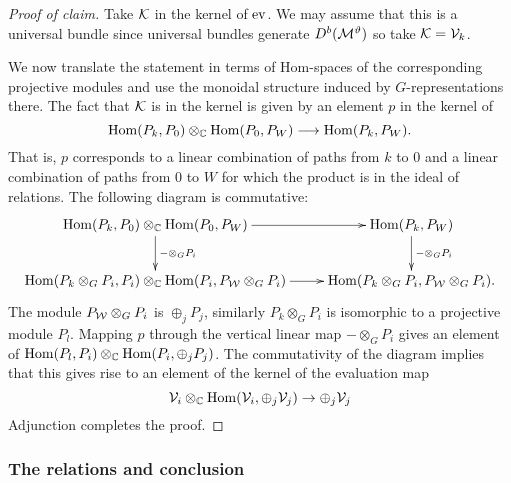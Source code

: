 \documentclass{amsart}
\theoremstyle{definition}
\begin{document}
\begin{proof}[Proof of claim]
Take $\mathcal{K}$ in the kernel of $\operatorname{ev}$.
We may assume that this is a universal bundle since universal bundles generate $D^b(\mathcal{M}^\vartheta)$ so take $\mathcal{K}=\mathcal{V}_k$.

We now translate the statement in terms of Hom-spaces of the corresponding projective modules and use the monoidal structure induced by $G$-representations there.
The fact that $\mathcal{K}$ is in the kernel is given by an element $p$ in the kernel of 
\begin{equation}
    \operatorname{Hom}(P_k, P_0) \otimes_{\mathbb{C}} \operatorname{Hom}(P_0, P_W) \longrightarrow \operatorname{Hom}(P_k, P_W).
\end{equation}
That is, $p$ corresponds to a linear combination of paths from $k$ to $0$ and a linear combination of paths from $0$ to $W$ for which the product is in the ideal of relations.
The following diagram is commutative:
\begin{equation*}
    \xymatrix{\Hom(P_k, P_0) \otimes_\bC \Hom(P_0, P_W) \ar[r] \ar[d]^{- \otimes_G P_i} & \Hom(P_k, P_W) \ar[d]^{- \otimes_G P_i} \\
    \Hom(P_k \otimes_G P_i, P_i) \otimes_\bC \Hom(P_i, P_\cW \otimes_G P_i) \ar[r] & \Hom(P_k \otimes_G P_i, P_\cW \otimes_G P_i).}
\end{equation*}
The module $P_{\mathcal{W}} \otimes_G P_i$ is $\oplus_j P_j$, similarly $P_k \otimes_G P_i$ is isomorphic to a projective module $P_l$. 
Mapping $p$ through the vertical linear map $- \otimes_G P_i$ gives an element of $\operatorname{Hom}(P_l, P_i) \otimes_{\mathbb{C}} \operatorname{Hom}(P_i, \oplus_j P_j)$.
The commutativity of the diagram implies that this gives rise to an element of the kernel of the evaluation map $$\mathcal{V}_i \otimes_{\mathbb{C}} \operatorname{Hom}(\mathcal{V}_i, \oplus_j \mathcal{V}_j) \rightarrow \oplus_j \mathcal{V}_j$$
Adjunction completes the proof.
\end{proof}


\subsubsection{The relations and conclusion}
\end{document}
